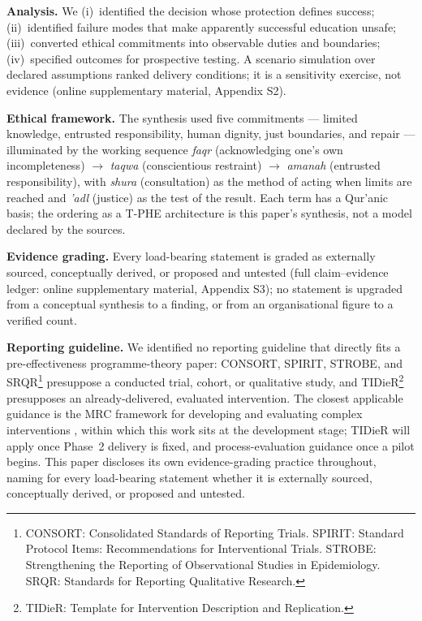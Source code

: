 \documentclass[11pt]{article}
\newcommand{\tphe}{T\mbox{-}PHE}
\begin{document}
\textbf{Analysis.} We (i)~identified the decision whose protection defines success; (ii)~identified failure modes that make apparently successful education unsafe; (iii)~converted ethical commitments into observable duties and boundaries; (iv)~specified outcomes for prospective testing. A scenario simulation over declared assumptions ranked delivery conditions; it is a sensitivity exercise, not evidence (online supplementary material, Appendix S2).

\textbf{Ethical framework.} The synthesis used five commitments --- limited knowledge, entrusted responsibility, human dignity, just boundaries, and repair --- illuminated by the working sequence \emph{faqr} (acknowledging one's own incompleteness) $\rightarrow$ \emph{taqwa} (conscientious restraint) $\rightarrow$ \emph{amanah} (entrusted responsibility), with \emph{shura} (consultation) as the method of acting when limits are reached and \emph{\textquoteright adl} (justice) as the test of the result. Each term has a Qur'anic basis; the ordering as a \tphe{} architecture is this paper's synthesis, not a model declared by the sources.

\textbf{Evidence grading.} Every load-bearing statement is graded as externally sourced, conceptually derived, or proposed and untested (full claim--evidence ledger: online supplementary material, Appendix S3); no statement is upgraded from a conceptual synthesis to a finding, or from an organisational figure to a verified count.

\textbf{Reporting guideline.} We identified no reporting guideline that directly fits a pre-effectiveness programme-theory paper: CONSORT, SPIRIT, STROBE, and SRQR\footnote{CONSORT: Consolidated Standards of Reporting Trials. SPIRIT: Standard Protocol Items: Recommendations for Interventional Trials. STROBE: Strengthening the Reporting of Observational Studies in Epidemiology. SRQR: Standards for Reporting Qualitative Research.} presuppose a conducted trial, cohort, or qualitative study, and TIDieR\footnote{TIDieR: Template for Intervention Description and Replication.} presupposes an already-delivered, evaluated intervention. The closest applicable guidance is the MRC framework for developing and evaluating complex interventions \cite{ref52}, within which this work sits at the development stage; TIDieR will apply once Phase~2 delivery is fixed, and process-evaluation guidance \cite{ref54} once a pilot begins. This paper discloses its own evidence-grading practice throughout, naming for every load-bearing statement whether it is externally sourced, conceptually derived, or proposed and untested.
\end{document}
